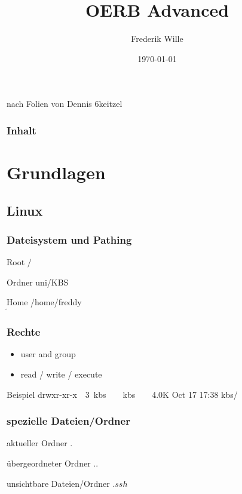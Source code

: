 \documentclass{beamer}
\begin{document}
    \title{OERB Advanced}
    \author{Frederik Wille}

    \date{\today}

    \begin{frame}
        \titlepage
        {\tiny nach Folien von Dennis 6keitzel}
    \end{frame}

    \begin{frame}
        \frametitle{Inhalt}
        \tableofcontents
    \end{frame}

    \section{Grundlagen}
    \subsection{Linux}
    \begin{frame}
        \frametitle{Dateisystem und Pathing}
        \begin{block}{Root}
            $/$
        \end{block}
        \begin{block}{Ordner}
            uni/KBS
        \end{block}
        \begin{block}{Home}
            /home/freddy \\
            $\tilde \ $
        \end{block}
    \end{frame}

    \begin{frame}
        \frametitle{Rechte}
        \begin{itemize}
            \item user and group
            \item read / write / execute
        \end{itemize}
        \begin{block}{Beispiel}
            drwxr-xr-x\ \ 3\ kbs\ \ \ \ kbs\ \ \ \ 4.0K Oct 17 17:38 kbs/
        \end{block}
    \end{frame}

    \begin{frame}
        \frametitle{spezielle Dateien/Ordner}
        \begin{block}{aktueller Ordner}
            $.$
        \end{block}
        \begin{block}{übergeordneter Ordner}
            $..$
        \end{block}
        \begin{block}{unsichtbare Dateien/Ordner}
            $.ssh$
        \end{block}
    \end{frame}
\end{document}
